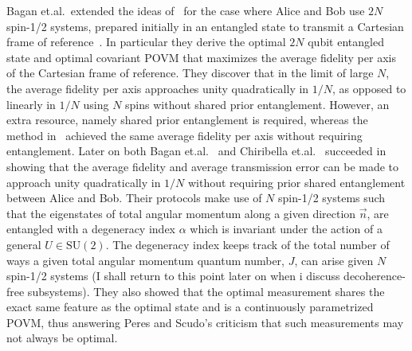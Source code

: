 \documentclass{article}
\begin{document}
Bagan et.al.~extended the ideas of~\cite{AJV01} for the case where Alice and Bob use $2N$ spin-1/2 systems, prepared initially in an entangled state to transmit a Cartesian frame of reference~\cite{BBM04a}.  In particular they derive the optimal $2N$ qubit entangled state and optimal covariant POVM that maximizes the average fidelity per axis of the Cartesian frame of reference. They discover that in the limit of large $N$, the average fidelity per axis approaches unity quadratically in $1/N$, as opposed to linearly in $1/N$ using $N$ spins without shared prior entanglement.  However, an extra resource, namely shared prior entanglement is required, whereas the method in~\cite{PS02a,PS02b} achieved the same average fidelity per axis without requiring entanglement.  Later on both Bagan et.al.~\cite{BBM04a} and Chiribella et.al.~\cite{CDPS04a} succeeded in showing that the average fidelity and average transmission error can be made to approach unity quadratically in $1/N$ without requiring prior shared entanglement between Alice and Bob.  Their protocols make use of $N$ spin-1/2 systems such that the eigenstates of total angular momentum along a given direction $\vec{n}$, are entangled with a degeneracy index $\alpha$ which is invariant under the action of a general $U\in\mathrm{SU}(2)$.  The degeneracy index keeps track of the total number of ways a given total angular momentum quantum number, $J$, can arise given $N$ spin-1/2 systems (I shall return to this point later on when i discuss decoherence-free subsystems).  They also showed that the optimal measurement shares the exact same feature as the optimal state and is a continuously parametrized POVM, thus answering Peres and Scudo's criticism that such measurements may not always be optimal.
\end{document}
